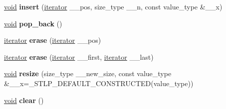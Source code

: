 \begin{DoxyCompactItemize}
\mbox{\label{structvector_a365ee13256024b554511aef4afbc4185}} 
\hyperlink{interfacevoid}{void} {\bfseries insert} (\hyperlink{structiterator}{iterator} \+\_\+\+\_\+pos, size\+\_\+type \+\_\+\+\_\+n, const value\+\_\+type \&\+\_\+\+\_\+x)
\item 
\mbox{\label{structvector_a0b283d31b60efcb22635718006e37050}} 
\hyperlink{interfacevoid}{void} {\bfseries pop\+\_\+back} ()
\item 
\mbox{\label{structvector_a03451bcd692e6d29f636a2a3cc6396a5}} 
\hyperlink{structiterator}{iterator} {\bfseries erase} (\hyperlink{structiterator}{iterator} \+\_\+\+\_\+pos)
\item 
\mbox{\label{structvector_ac43a0f26f53b294f0648655224aac1d3}} 
\hyperlink{structiterator}{iterator} {\bfseries erase} (\hyperlink{structiterator}{iterator} \+\_\+\+\_\+first, \hyperlink{structiterator}{iterator} \+\_\+\+\_\+last)
\item 
\mbox{\label{structvector_ad5ba0b3387ca22d9fc861fee9b650611}} 
\hyperlink{interfacevoid}{void} {\bfseries resize} (size\+\_\+type \+\_\+\+\_\+new\+\_\+size, const value\+\_\+type \&\+\_\+\+\_\+x=\+\_\+\+S\+T\+L\+P\+\_\+\+D\+E\+F\+A\+U\+L\+T\+\_\+\+C\+O\+N\+S\+T\+R\+U\+C\+T\+ED(value\+\_\+type))
\item 
\mbox{\label{structvector_ac981f7afffb33e12f772f98a23919a04}} 
\hyperlink{interfacevoid}{void} {\bfseries clear} ()
\end{DoxyCompactItemize}
